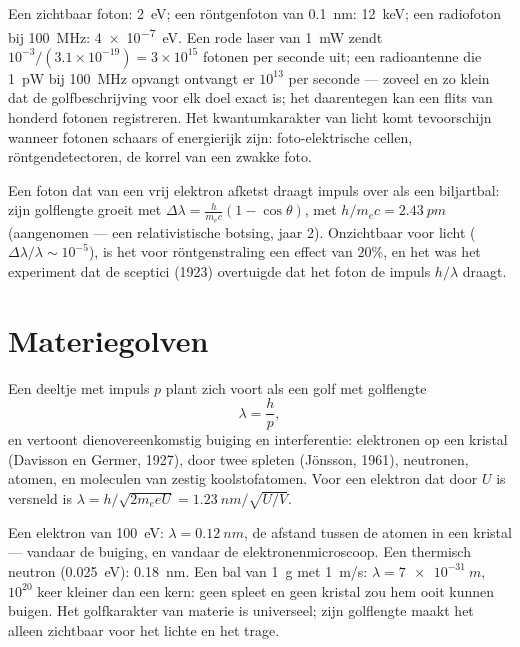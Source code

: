 \begin{example}\label{ex:b1:quantum-introduction:orders}
Een zichtbaar foton: \qty{2}{eV}; een röntgenfoton van \qty{0.1}{nm}: \qty{12}{keV};
een radiofoton bij \qty{100}{MHz}: \qty{4e-7}{eV}. Een rode laser van \qty{1}{mW}
zendt $10^{-3}/(3.1 \times 10^{-19}) = 3 \times 10^{15}$ fotonen per seconde uit;
een radioantenne die \qty{1}{pW} bij \qty{100}{MHz} opvangt ontvangt er $10^{13}$
per seconde --- zoveel en zo klein dat de golfbeschrijving voor elk
doel exact is; het  daarentegen kan een flits van
honderd fotonen registreren. Het kwantumkarakter van licht komt tevoorschijn wanneer fotonen
schaars of energierijk zijn: foto-elektrische cellen, röntgendetectoren, de korrel van een
zwakke foto.
\end{example}

\begin{remark}[Comptonverstrooiing]\label{rem:b1:quantum-introduction:compton}
Een foton dat van een vrij elektron afketst draagt impuls over als een
biljartbal: zijn golflengte groeit met $\Delta\lambda = \frac{h}{m_ec}(1 -
\cos\theta)$, met $h/m_ec = \qty{2.43}{pm}$ (aangenomen --- een relativistische
botsing, jaar 2). Onzichtbaar voor licht ($\Delta\lambda/\lambda \sim 10^{-5}$),
is het voor röntgenstraling een effect van $20\%$, en het was het experiment dat
de sceptici (1923) overtuigde dat het foton de impuls $h/\lambda$ draagt.
\end{remark}

\section{Materiegolven}

\begin{theorem}[De Broglie]\label{thm:b1:quantum-introduction:debroglie}
Een deeltje met impuls $p$ plant zich voort als een golf met golflengte
\[
\lambda = \frac{h}{p} ,
\]
en vertoont dienovereenkomstig buiging en interferentie: elektronen op een
kristal (Davisson en Germer, 1927), door twee spleten (Jönsson, 1961),
neutronen, atomen, en moleculen van zestig koolstofatomen. Voor een elektron
dat door $U$ is versneld is $\lambda = h/\sqrt{2m_eeU} = \qty{1.23}{nm}/\sqrt{U/\unit{V}}$.
\end{theorem}
\admitted

\begin{example}\label{ex:b1:quantum-introduction:wavelengths}
Een elektron van \qty{100}{eV}: $\lambda = \qty{0.12}{nm}$, de afstand tussen
de atomen in een kristal --- vandaar de buiging, en vandaar de
elektronenmicroscoop. Een thermisch neutron (\qty{0.025}{eV}): \qty{0.18}{nm}. Een bal
van \qty{1}{g} met \qty{1}{m/s}: $\lambda = \qty{7e-31}{m}$, $10^{20}$ keer
kleiner dan een kern: geen spleet en geen kristal zou hem ooit kunnen buigen. Het
golfkarakter van materie is universeel; zijn golflengte maakt het alleen
zichtbaar voor het lichte en het trage.
\end{example}

